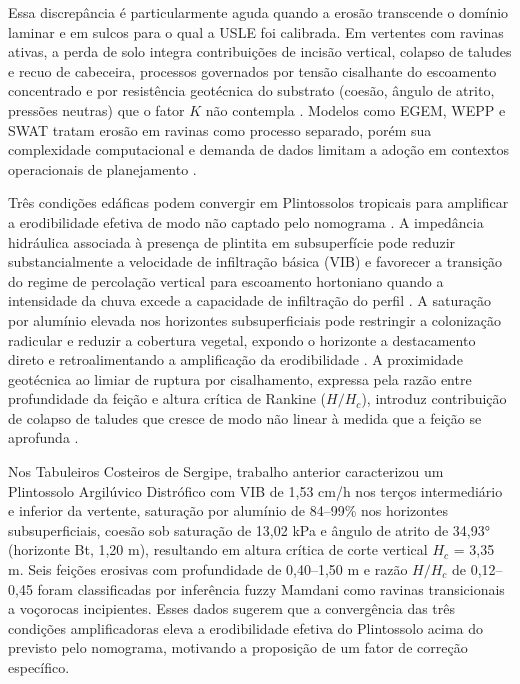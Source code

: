 \documentclass[
  brazilian,
  authoryear,
  preprint]{elsarticle}
\begin{document}
Essa discrepância é particularmente aguda quando a erosão transcende o
domínio laminar e em sulcos para o qual a USLE foi calibrada. Em
vertentes com ravinas ativas, a perda de solo integra contribuições de
incisão vertical, colapso de taludes e recuo de cabeceira, processos
governados por tensão cisalhante do escoamento concentrado e por
resistência geotécnica do substrato (coesão, ângulo de atrito, pressões
neutras) que o fator \(K\) não contempla
\citep{poesen_et_al_2003, liu_et_al_2021}. Modelos como EGEM, WEPP e
SWAT tratam erosão em ravinas como processo separado, porém sua
complexidade computacional e demanda de dados limitam a adoção em
contextos operacionais de planejamento \citep{alewell_et_al_2019}.

Três condições edáficas podem convergir em Plintossolos tropicais para
amplificar a erodibilidade efetiva de modo não captado pelo nomograma
\citep{padmanabhan_2005, ribeiro_filho_et_al_2023}. A impedância
hidráulica associada à presença de plintita em subsuperfície pode
reduzir substancialmente a velocidade de infiltração básica (VIB) e
favorecer a transição do regime de percolação vertical para escoamento
hortoniano quando a intensidade da chuva excede a capacidade de
infiltração do perfil
\citep{padmanabhan_2005, wang_et_al_2020, horton_1933}. A saturação por
alumínio elevada nos horizontes subsuperficiais pode restringir a
colonização radicular e reduzir a cobertura vegetal, expondo o horizonte
a destacamento direto e retroalimentando a amplificação da erodibilidade
\citep{rao_et_al_2016, vannoppen_2015}. A proximidade geotécnica ao
limiar de ruptura por cisalhamento, expressa pela razão entre
profundidade da feição e altura crítica de Rankine (\(H/H_c\)), introduz
contribuição de colapso de taludes que cresce de modo não linear à
medida que a feição se aprofunda
\citep{poesen_et_al_2003, sidorchuk_2006}.

Nos Tabuleiros Costeiros de Sergipe, trabalho anterior caracterizou um
Plintossolo Argilúvico Distrófico com VIB de 1,53 cm/h nos terços
intermediário e inferior da vertente, saturação por alumínio de 84--99\%
nos horizontes subsuperficiais, coesão sob saturação de 13,02 kPa e
ângulo de atrito de 34,93° (horizonte Bt, 1,20 m), resultando em altura
crítica de corte vertical \(H_c\) = 3,35 m. Seis feições erosivas com
profundidade de 0,40--1,50 m e razão \(H/H_c\) de 0,12--0,45 foram
classificadas por inferência fuzzy Mamdani como ravinas transicionais a
voçorocas incipientes. Esses dados sugerem que a convergência das três
condições amplificadoras eleva a erodibilidade efetiva do Plintossolo
acima do previsto pelo nomograma, motivando a proposição de um fator de
correção específico.
\end{document}
